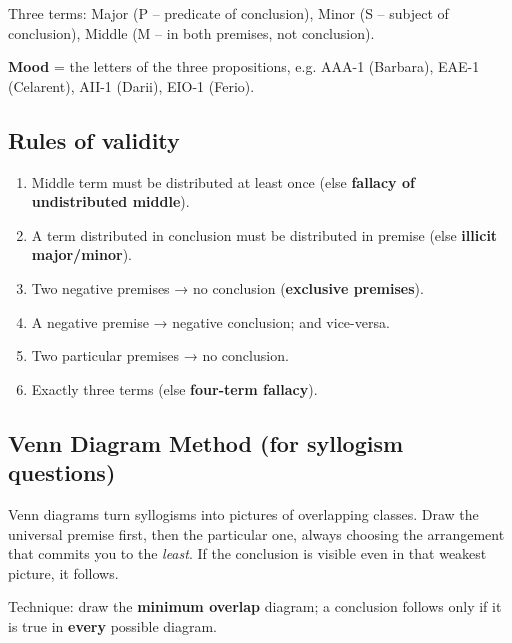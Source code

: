 Three terms: Major (P -- predicate of conclusion), Minor (S -- subject of conclusion), Middle (M -- in both premises, not conclusion).



\textbf{Mood} = the letters of the three propositions, e.g. AAA-1 (Barbara), EAE-1 (Celarent), AII-1 (Darii), EIO-1 (Ferio).

\needspace{95pt}

\hypertarget{p1-06--rules-of-validity}{%
\subsection{Rules of validity}\label{p1-06--rules-of-validity}}

\begin{enumerate}
\def\labelenumi{\arabic{enumi}.}
\tightlist
\item
  Middle term must be distributed at least once (else \textbf{fallacy of undistributed middle}).
\item
  A term distributed in conclusion must be distributed in premise (else \textbf{illicit major/minor}).
\item
  Two negative premises → no conclusion (\textbf{exclusive premises}).
\item
  A negative premise → negative conclusion; and vice-versa.
\item
  Two particular premises → no conclusion.
\item
  Exactly three terms (else \textbf{four-term fallacy}).
\end{enumerate}

\needspace{125pt}

\hypertarget{p1-06--venn-diagram-method-for-syllogism-questions}{%
\subsection{Venn Diagram Method (for syllogism questions)}\label{p1-06--venn-diagram-method-for-syllogism-questions}}

Venn diagrams turn syllogisms into pictures of overlapping classes. Draw the universal premise first, then
the particular one, always choosing the arrangement that commits you to the \emph{least}. If the conclusion is
visible even in that weakest picture, it follows.



Technique: draw the \textbf{minimum overlap} diagram; a conclusion follows only if it is true in \textbf{every} possible diagram.

